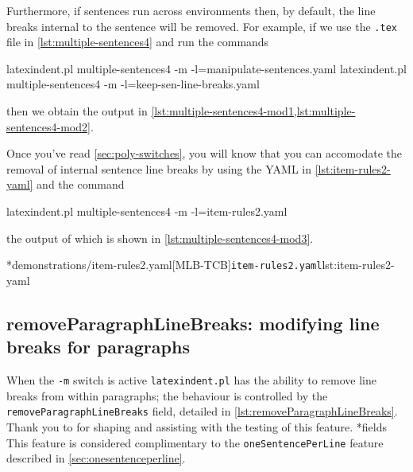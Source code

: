 	Furthermore, if sentences run across environments then, by default, the line breaks internal to the sentence will be removed.
	For example, if we use the \texttt{.tex} file in \cref{lst:multiple-sentences4} and run the commands
	\begin{commandshell}
latexindent.pl multiple-sentences4 -m -l=manipulate-sentences.yaml
latexindent.pl multiple-sentences4 -m -l=keep-sen-line-breaks.yaml
	\end{commandshell}
	then we obtain the output in \cref{lst:multiple-sentences4-mod1,lst:multiple-sentences4-mod2}.
	\begin{widepage}
	\end{widepage}
	Once you've read \cref{sec:poly-switches}, you will know that you can accomodate the removal of internal sentence line breaks
	by using the YAML in \cref{lst:item-rules2-yaml} and the command
	\begin{commandshell}
latexindent.pl multiple-sentences4 -m -l=item-rules2.yaml
	\end{commandshell}
	the output of which is shown in \cref{lst:multiple-sentences4-mod3}.

	\begin{minipage}{.5\linewidth}
	\end{minipage}
	\hfill
	\begin{minipage}{.5\linewidth}
		\cmhlistingsfromfile[style=yaml-LST]*{demonstrations/item-rules2.yaml}[MLB-TCB]{\texttt{item-rules2.yaml}}{lst:item-rules2-yaml}
	\end{minipage}

\subsection{removeParagraphLineBreaks: modifying line breaks for paragraphs}
	When the \texttt{-m} switch is active \texttt{latexindent.pl} has the ability to remove line breaks
	from within paragraphs; the behaviour is controlled by the \texttt{removeParagraphLineBreaks} field, detailed in
	\cref{lst:removeParagraphLineBreaks}. Thank you to \cite{jowens} for shaping and assisting with the testing of this feature.
*{fields}
	This feature is considered complimentary to the \texttt{oneSentencePerLine} feature described in \vref{sec:onesentenceperline}.

